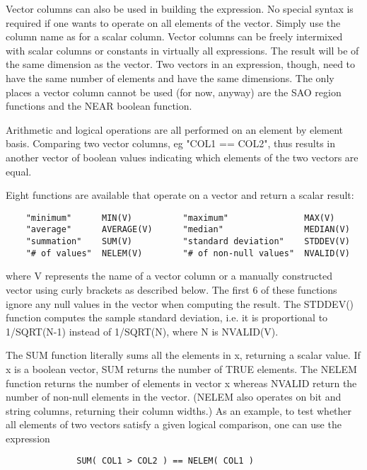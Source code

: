 \documentclass[11pt]{book}
\begin{document}
    Vector columns can also be used  in  building  the  expression.   No
    special  syntax  is required if one wants to operate on all elements
    of the vector.  Simply use the column name as for a  scalar  column.
    Vector  columns  can  be  freely  intermixed  with scalar columns or
    constants in virtually all expressions.  The result will be  of  the
    same dimension as the vector.  Two vectors in an expression, though,
    need to  have  the  same  number  of  elements  and  have  the  same
    dimensions.   The  only  places  a vector column cannot be used (for
    now, anyway) are the SAO  region  functions  and  the  NEAR  boolean
    function.

    Arithmetic and logical operations are all performed on an element by
    element basis.  Comparing two vector columns,  eg  "COL1  ==  COL2",
    thus  results  in  another vector of boolean values indicating which
    elements of the two vectors are equal.

    Eight functions are available that operate on a vector and return a
    scalar result:

\begin{verbatim}
    "minimum"      MIN(V)          "maximum"               MAX(V)
    "average"      AVERAGE(V)      "median"                MEDIAN(V)
    "summation"    SUM(V)          "standard deviation"    STDDEV(V)
    "# of values"  NELEM(V)        "# of non-null values"  NVALID(V)
\end{verbatim}
    where V represents the name of a vector column or a manually
    constructed vector using curly brackets as described below.  The
    first 6 of these functions ignore any null values in the vector when
    computing the result.  The STDDEV() function computes the sample
    standard deviation, i.e. it is proportional to 1/SQRT(N-1) instead
    of 1/SQRT(N), where N is NVALID(V).

    The SUM function literally sums all  the elements in x,  returning a
    scalar value.   If x  is  a  boolean  vector, SUM returns the number
    of TRUE elements. The NELEM function  returns the number of elements
    in vector x whereas NVALID return the number of non-null elements in
    the  vector.   (NELEM  also  operates  on  bit  and string  columns,
    returning their column widths.)  As an example, to  test whether all
    elements of two vectors satisfy a  given logical comparison, one can
    use the expression

\begin{verbatim}
              SUM( COL1 > COL2 ) == NELEM( COL1 )
\end{verbatim}
\end{document}
